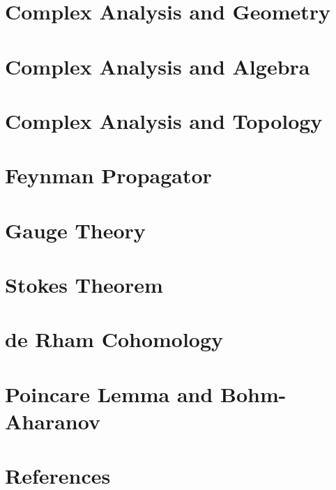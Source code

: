 \documentclass[12pt]{article}
\theoremstyle{definition}
\theoremstyle{remark}
\theoremstyle{example}
\begin{document}
\section{Complex Analysis and Geometry}

\section{Complex Analysis and Algebra}

\section{Complex Analysis and Topology}

\section{Feynman Propagator}

\section{Gauge Theory}

\section{Stokes Theorem}

\section{de Rham Cohomology}

\section{Poincare Lemma and Bohm-Aharanov}

\section{References}
\end{document}
